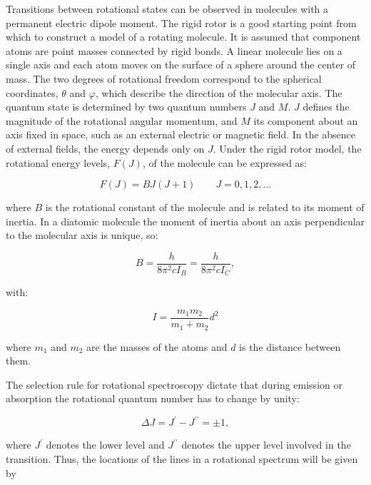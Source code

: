\documentclass[
  9pt,
]{extbook}
\theoremstyle{definition}
\theoremstyle{definition}
\theoremstyle{definition}
\theoremstyle{remark}
\begin{document}
Transitions between rotational states can be observed in molecules with a permanent electric dipole moment. The rigid rotor is a good starting point from which to construct a model of a rotating molecule. It is assumed that component atoms are point masses connected by rigid bonds. A linear molecule lies on a single axis and each atom moves on the surface of a sphere around the center of mass. The two degrees of rotational freedom correspond to the spherical coordinates, \(\theta\) and \(\varphi\), which describe the direction of the molecular axis. The quantum state is determined by two quantum numbers \(J\) and \(M\). \(J\) defines the magnitude of the rotational angular momentum, and \(M\) its component about an axis fixed in space, such as an external electric or magnetic field. In the absence of external fields, the energy depends only on \(J\). Under the rigid rotor model, the rotational energy levels, \(F(J)\), of the molecule can be expressed as:

\begin{equation}
F\left(J\right)=BJ\left(J+1\right)\qquad J=0,1,2,\ldots
\label{eq:rot1}
\end{equation}

where \(B\) is the rotational constant of the molecule and is related to its moment of inertia. In a diatomic molecule the moment of inertia about an axis perpendicular to the molecular axis is unique, so:

\begin{equation}
B={\frac{h}{8\pi ^{2}cI_{B}}}={\frac{h}{8\pi ^{2}cI_{C}}},
\label{eq:rot2}
\end{equation}

with:

\begin{equation}
 I=\frac{m_1m_2}{m_1 +m_2}d^2 
 \label{eq:rot3}
\end{equation}

where \(m_1\) and \(m_2\) are the masses of the atoms and \(d\) is the distance between them.

The selection rule for rotational spectroscopy dictate that during emission or absorption the rotational quantum number has to change by unity:

\begin{equation}
 \Delta J = J^{{\prime }} - J^{{\prime \prime }} = \pm 1,
 \label{eq:rot4}
\end{equation}

where \(J^{{\prime }}\) denotes the lower level and \(J^{{\prime \prime }}\) denotes the upper level involved in the transition. Thus, the locations of the lines in a rotational spectrum will be given by
\end{document}
